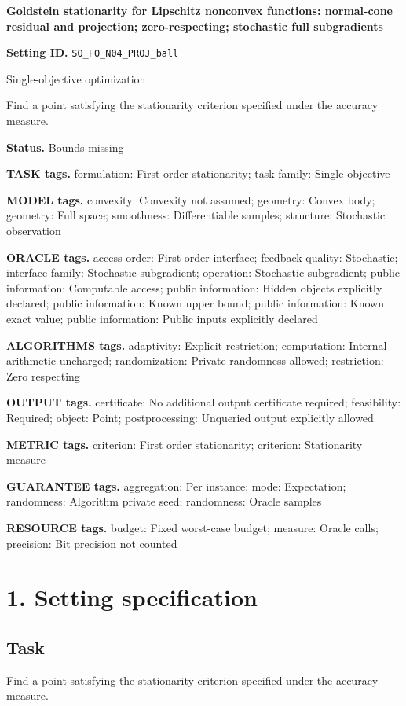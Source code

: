 \documentclass[10pt,a4paper]{article}
\begin{document}
\raggedright

{\LARGE\bfseries\sffamily\color{AtlasNavy} Goldstein stationarity for Lipschitz nonconvex functions: normal-cone residual and projection; zero-respecting; stochastic full subgradients\par}\vspace{5pt}
\textbf{Setting ID.} \texttt{SO\_\allowbreak{}FO\_\allowbreak{}N04\_\allowbreak{}PROJ\_\allowbreak{}ball}

Single-objective optimization

Find a point satisfying the stationarity criterion specified under the accuracy measure.

\textbf{Status.} Bounds missing

\textbf{TASK tags.} formulation: First order stationarity; task family: Single objective

\textbf{MODEL tags.} convexity: Convexity not assumed; geometry: Convex body; geometry: Full space; smoothness: Differentiable samples; structure: Stochastic observation

\textbf{ORACLE tags.} access order: First-order interface; feedback quality: Stochastic; interface family: Stochastic subgradient; operation: Stochastic subgradient; public information: Computable access; public information: Hidden objects explicitly declared; public information: Known upper bound; public information: Known exact value; public information: Public inputs explicitly declared

\textbf{ALGORITHMS tags.} adaptivity: Explicit restriction; computation: Internal arithmetic uncharged; randomization: Private randomness allowed; restriction: Zero respecting

\textbf{OUTPUT tags.} certificate: No additional output certificate required; feasibility: Required; object: Point; postprocessing: Unqueried output explicitly allowed

\textbf{METRIC tags.} criterion: First order stationarity; criterion: Stationarity measure

\textbf{GUARANTEE tags.} aggregation: Per instance; mode: Expectation; randomness: Algorithm private seed; randomness: Oracle samples

\textbf{RESOURCE tags.} budget: Fixed worst-case budget; measure: Oracle calls; precision: Bit precision not counted

\section{1. Setting specification}
\subsection{Task}
Find a point satisfying the stationarity criterion specified under the accuracy measure.
\end{document}

